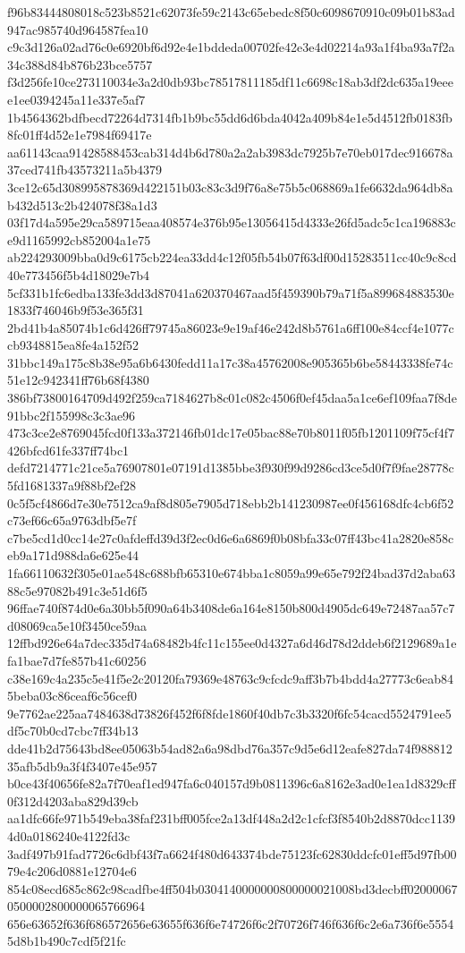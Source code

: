 {f96b83444808018c523b8521c62073fe59c2143c65ebedc8f50c6098670910c09b01b83ad947ac985740d964587fea10
c9c3d126a02ad76c0e6920bf6d92e4e1bddeda00702fe42e3e4d02214a93a1f4ba93a7f2a34c388d84b876b23bce5757
f3d256fe10ce273110034e3a2d0db93bc78517811185df11c6698c18ab3df2dc635a19eeee1ee0394245a11e337e5af7
1b4564362bdfbecd72264d7314fb1b9bc55dd6d6bda4042a409b84e1e5d4512fb0183fb8fc01ff4d52e1e7984f69417e
aa61143caa91428588453cab314d4b6d780a2a2ab3983dc7925b7e70eb017dec916678a37ced741fb43573211a5b4379
3ce12c65d308995878369d422151b03c83c3d9f76a8e75b5c068869a1fe6632da964db8ab432d513c2b424078f38a1d3
03f17d4a595e29ca589715eaa408574e376b95e13056415d4333e26fd5adc5c1ca196883ce9d1165992cb852004a1e75
ab224293009bba0d9c6175cb224ea33dd4c12f05fb54b07f63df00d15283511cc40c9c8cd40e773456f5b4d18029e7b4
5cf331b1fc6edba133fe3dd3d87041a620370467aad5f459390b79a71f5a899684883530e1833f746046b9f53e365f31
2bd41b4a85074b1c6d426ff79745a86023e9e19af46e242d8b5761a6ff100e84ccf4e1077ccb9348815ea8fe4a152f52
31bbc149a175c8b38e95a6b6430fedd11a17c38a45762008e905365b6be58443338fe74c51e12c942341ff76b68f4380
386bf73800164709d492f259ca7184627b8c01c082c4506f0ef45daa5a1ce6ef109faa7f8de91bbc2f155998c3c3ae96
473c3ce2e8769045fcd0f133a372146fb01dc17e05bac88e70b8011f05fb1201109f75cf4f7426bfcd61fe337ff74bc1
defd7214771c21ce5a76907801e07191d1385bbe3f930f99d9286cd3ce5d0f7f9fae28778c5fd1681337a9f88bf2ef28
0c5f5cf4866d7e30e7512ca9af8d805e7905d718ebb2b141230987ee0f456168dfc4cb6f52c73ef66c65a9763dbf5e7f
c7be5cd1d0cc14e27c0afdeffd39d3f2ec0d6e6a6869f0b08bfa33c07ff43bc41a2820e858ceb9a171d988da6e625e44
1fa66110632f305e01ae548c688bfb65310e674bba1c8059a99e65e792f24bad37d2aba6388c5e97082b491c3e51d6f5
96ffae740f874d0e6a30bb5f090a64b3408de6a164e8150b800d4905dc649e72487aa57c7d08069ca5e10f3450ce59aa
12ffbd926e64a7dec335d74a68482b4fc11c155ee0d4327a6d46d78d2ddeb6f2129689a1efa1bae7d7fe857b41c60256
c38e169c4a235c5e41f5e2c20120fa79369e48763c9cfcdc9aff3b7b4bdd4a27773c6eab845beba03c86ceaf6c56cef0
9e7762ae225aa7484638d73826f452f6f8fde1860f40db7c3b3320f6fc54cacd5524791ee5df5c70b0cd7cbc7ff34b13
dde41b2d75643bd8ee05063b54ad82a6a98dbd76a357c9d5e6d12eafe827da74f98881235afb5db9a3f4f3407e45e957
b0ce43f40656fe82a7f70eaf1ed947fa6c040157d9b0811396c6a8162e3ad0e1ea1d8329cff0f312d4203aba829d39cb
aa1dfc66fe971b549eba38faf231bff005fce2a13df448a2d2c1cfcf3f8540b2d8870dcc11394d0a0186240e4122fd3c
3adf497b91fad7726c6dbf43f7a6624f480d643374bde75123fc62830ddcfc01eff5d97fb0079e4c206d0881e12704e6
854c08ecd685c862c98cadfbe4ff504b0304140000000800000021008bd3decbff020000670500002800000065766964
656e63652f636f686572656e63655f636f6e74726f6c2f70726f746f636f6c2e6a736f6e55545d8b1b490c7cdf5f21fc
}
